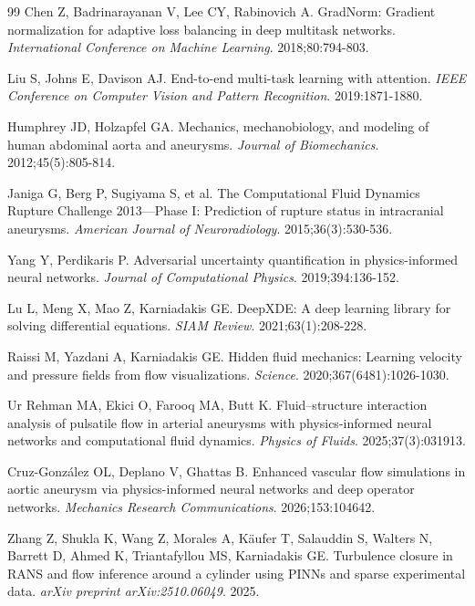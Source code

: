 \documentclass[11pt,a4paper]{article}
\begin{document}
\begin{thebibliography}{99}
 Chen Z, Badrinarayanan V, Lee CY, Rabinovich A. GradNorm: Gradient normalization for adaptive loss balancing in deep multitask networks. \textit{International Conference on Machine Learning}. 2018;80:794-803.

 Liu S, Johns E, Davison AJ. End-to-end multi-task learning with attention. \textit{IEEE Conference on Computer Vision and Pattern Recognition}. 2019:1871-1880.

 Humphrey JD, Holzapfel GA. Mechanics, mechanobiology, and modeling of human abdominal aorta and aneurysms. \textit{Journal of Biomechanics}. 2012;45(5):805-814.

 Janiga G, Berg P, Sugiyama S, et al. The Computational Fluid Dynamics Rupture Challenge 2013---Phase I: Prediction of rupture status in intracranial aneurysms. \textit{American Journal of Neuroradiology}. 2015;36(3):530-536.

 Yang Y, Perdikaris P. Adversarial uncertainty quantification in physics-informed neural networks. \textit{Journal of Computational Physics}. 2019;394:136-152.

 Lu L, Meng X, Mao Z, Karniadakis GE. DeepXDE: A deep learning library for solving differential equations. \textit{SIAM Review}. 2021;63(1):208-228.

 Raissi M, Yazdani A, Karniadakis GE. Hidden fluid mechanics: Learning velocity and pressure fields from flow visualizations. \textit{Science}. 2020;367(6481):1026-1030.

 Ur Rehman MA, Ekici O, Farooq MA, Butt K. Fluid--structure interaction analysis of pulsatile flow in arterial aneurysms with physics-informed neural networks and computational fluid dynamics. \textit{Physics of Fluids}. 2025;37(3):031913.

 Cruz-Gonz{\'a}lez OL, Deplano V, Ghattas B. Enhanced vascular flow simulations in aortic aneurysm via physics-informed neural networks and deep operator networks. \textit{Mechanics Research Communications}. 2026;153:104642.

 Zhang Z, Shukla K, Wang Z, Morales A, K{\"a}ufer T, Salauddin S, Walters N, Barrett D, Ahmed K, Triantafyllou MS, Karniadakis GE. Turbulence closure in RANS and flow inference around a cylinder using PINNs and sparse experimental data. \textit{arXiv preprint arXiv:2510.06049}. 2025.

\end{thebibliography}
\end{document}
